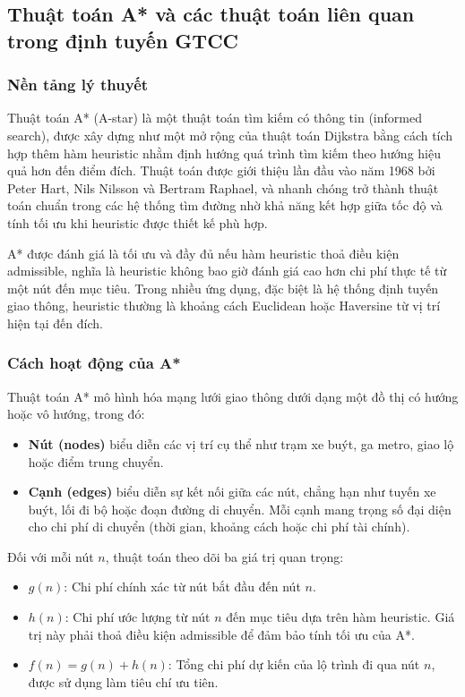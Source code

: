 \subsection{Thuật toán A* và các thuật toán liên quan trong định tuyến GTCC}
\subsubsection{Nền tảng lý thuyết}

Thuật toán A* (A-star) là một thuật toán tìm kiếm có thông tin (informed search), được xây dựng như một mở rộng của thuật toán Dijkstra bằng cách tích hợp thêm hàm heuristic nhằm định hướng quá trình tìm kiếm theo hướng hiệu quả hơn đến điểm đích. Thuật toán được giới thiệu lần đầu vào năm 1968 bởi Peter Hart, Nils Nilsson và Bertram Raphael, và nhanh chóng trở thành thuật toán chuẩn trong các hệ thống tìm đường nhờ khả năng kết hợp giữa tốc độ và tính tối ưu khi heuristic được thiết kế phù hợp.

A* được đánh giá là tối ưu và đầy đủ nếu hàm heuristic thoả điều kiện admissible, nghĩa là heuristic không bao giờ đánh giá cao hơn chi phí thực tế từ một nút đến mục tiêu. Trong nhiều ứng dụng, đặc biệt là hệ thống định tuyến giao thông, heuristic thường là khoảng cách Euclidean hoặc Haversine từ vị trí hiện tại đến đích.

\subsubsection{Cách hoạt động của A*}

Thuật toán A* mô hình hóa mạng lưới giao thông dưới dạng một đồ thị có hướng hoặc vô hướng, trong đó:

\begin{itemize}
    \item \textbf{Nút (nodes)} biểu diễn các vị trí cụ thể như trạm xe buýt, ga metro, giao lộ hoặc điểm trung chuyển.
    \item \textbf{Cạnh (edges)} biểu diễn sự kết nối giữa các nút, chẳng hạn như tuyến xe buýt, lối đi bộ hoặc đoạn đường di chuyển. Mỗi cạnh mang trọng số đại diện cho chi phí di chuyển (thời gian, khoảng cách hoặc chi phí tài chính).
\end{itemize}

Đối với mỗi nút $n$, thuật toán theo dõi ba giá trị quan trọng:

\begin{itemize}
    \item $g(n)$: Chi phí chính xác từ nút bắt đầu đến nút $n$.
    \item $h(n)$: Chi phí ước lượng từ nút $n$ đến mục tiêu dựa trên hàm heuristic. Giá trị này phải thoả điều kiện admissible để đảm bảo tính tối ưu của A*.
    \item $f(n) = g(n) + h(n)$: Tổng chi phí dự kiến của lộ trình đi qua nút $n$, được sử dụng làm tiêu chí ưu tiên.
\end{itemize}

